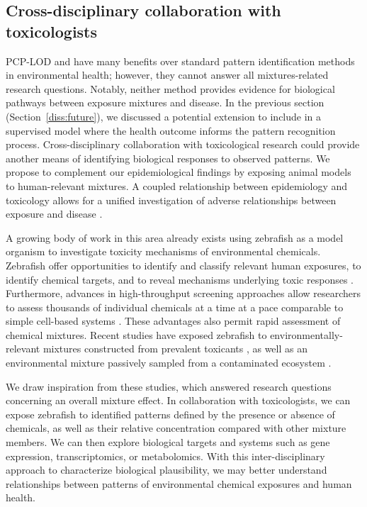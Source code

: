 \subsection{Cross-disciplinary collaboration with toxicologists}
PCP-LOD and \bnmf have many benefits over standard pattern identification methods in environmental health; however, they cannot answer all mixtures-related research questions. Notably, neither method provides evidence for biological pathways between exposure mixtures and disease. In the previous section (Section~\ref{diss:future}), we discussed a potential extension to include \bnmf in a supervised model where the health outcome informs the pattern recognition process. Cross-disciplinary collaboration with toxicological research could provide another means of identifying biological responses to observed patterns. We propose to complement our epidemiological findings by exposing animal models to human-relevant mixtures. A coupled relationship between epidemiology and toxicology allows for a unified investigation of adverse relationships between exposure and disease \citep{adami2011toxicology}.

A growing body of work in this area already exists using zebrafish as a model organism to investigate toxicity mechanisms of environmental chemicals. Zebrafish offer opportunities to identify and classify relevant human exposures, to identify chemical targets, and to reveal mechanisms underlying toxic responses \citep{vaz2019zebrafish}. Furthermore, advances in high-throughput screening approaches allow researchers to assess thousands of individual chemicals at a time at a pace comparable to simple cell-based systems \citep{tanguay2018rise}. These advantages also permit rapid assessment of chemical mixtures. Recent studies have exposed zebrafish to environmentally-relevant mixtures constructed from prevalent toxicants \citep{geier2018systematic}, as well as an environmental mixture passively sampled from a contaminated ecosystem \citep{bergmann2017using, allan2012bridging}. 

We draw inspiration from these studies, which answered research questions concerning an overall mixture effect. In collaboration with toxicologists, we can expose zebrafish to identified patterns defined by the presence or absence of chemicals, as well as their relative concentration compared with other mixture members. We can then explore biological targets and systems such as gene expression, transcriptomics, or metabolomics. With this inter-disciplinary approach to characterize biological plausibility, we may better understand relationships between patterns of environmental chemical exposures and human health.

